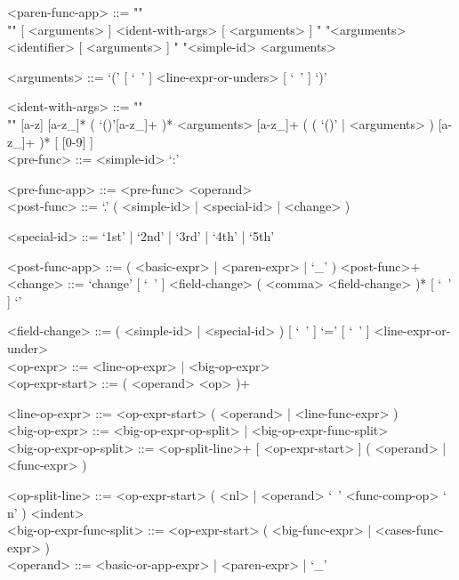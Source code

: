 \documentclass{article}
\begin{document}
\begin{grammar}
<paren-func-app> ::= ""\\""
[ <arguments> ] <ident-with-args> [ <arguments> ]
\alt " "<arguments> <identifier> [ <arguments> ]
\alt " "<simple-id> <arguments>

<arguments> ::= `(' [ `\ ' ] <line-expr-or-unders> [ `\ ' ] `)'

<ident-with-args> ::= ""\\""
[a-z] [a-z_]* ( `()'[a-z_]+ )* <arguments>
[a-z_]+ ( ( `()' | <arguments> ) [a-z_]+ )* 
[ [0-9] ]
\\

\newpage
<pre-func> ::= <simple-id> `:'

<pre-func-app> ::= <pre-func> <operand>
\\

<post-func> ::= `.' ( <simple-id> | <special-id> | <change> )

<special-id> ::= `1st' | `2nd' | `3rd' | `4th' | `5th'

<post-func-app> ::= ( <basic-expr> | <paren-expr> | `_' ) <post-func>+
\\

<change> ::=
`change{' [ `\ ' ] <field-change> ( <comma> <field-change> )* [ `\ ' ] `}'

<field-change> ::=
( <simple-id> | <special-id> ) [ `\ ' ] `=' [ `\ ' ] <line-expr-or-under>
\\

<op-expr> ::= <line-op-expr> | <big-op-expr>
\\

<op-expr-start> ::= ( <operand> <op> )+

<line-op-expr> ::= <op-expr-start> ( <operand> | <line-func-expr> )
\\

<big-op-expr> ::= 
<big-op-expr-op-split> | <big-op-expr-func-split>
\\

<big-op-expr-op-split> ::= 
<op-split-line>+ [ <op-expr-start> ] ( <operand> | <func-expr> )

<op-split-line> ::=
<op-expr-start> ( <nl> | <operand> `\ ' <func-comp-op> `\\n' ) <indent> 
\\

<big-op-expr-func-split> ::=
<op-expr-start> ( <big-func-expr> | <cases-func-expr> )
\\

<operand> ::= <basic-or-app-expr> | <paren-expr> | `_'
\\


\end{grammar}
\end{document}
